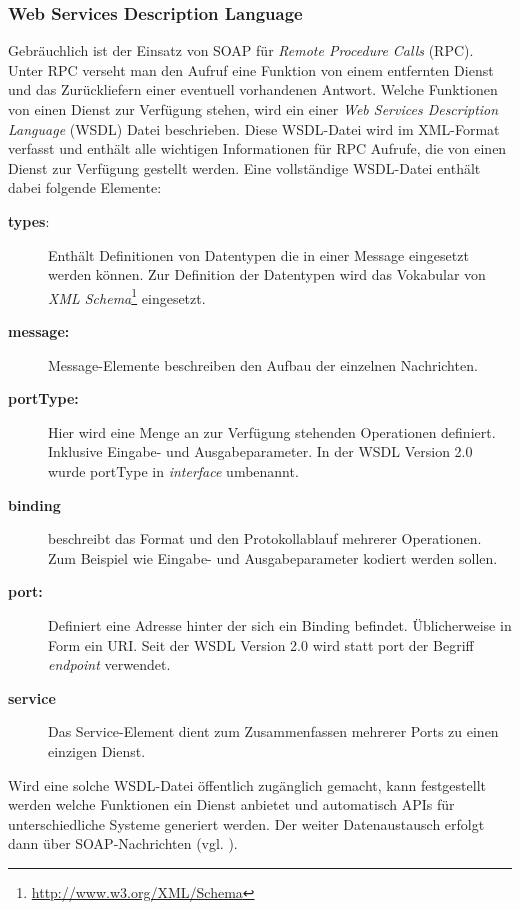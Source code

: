 \subsubsection{Web Services Description Language} %
\label{ssub:wsdl}


Gebräuchlich ist der Einsatz von SOAP für \emph{Remote Procedure Calls} (RPC). Unter RPC verseht man den Aufruf eine Funktion von einem entfernten Dienst und das Zurückliefern einer eventuell vorhandenen Antwort. Welche Funktionen von einen Dienst zur Verfügung stehen, wird ein einer \emph{Web Services Description Language} (WSDL) Datei beschrieben. Diese WSDL-Datei wird im XML-Format verfasst und enthält alle wichtigen Informationen für RPC Aufrufe, die von einen Dienst zur Verfügung gestellt werden. Eine vollständige WSDL-Datei enthält dabei folgende Elemente:

\begin{description}
    \item[\textbf{types}:] Enthält Definitionen von Datentypen die in einer Message eingesetzt werden können. Zur Definition der Datentypen wird das Vokabular von \emph{XML Schema}\footnote{\url{http://www.w3.org/XML/Schema}} eingesetzt.
    \item[\textbf{message:}] Message-Elemente beschreiben den Aufbau der einzelnen Nachrichten.
    \item[\textbf{portType:}] Hier wird eine Menge an zur Verfügung stehenden Operationen definiert. Inklusive Eingabe- und Ausgabeparameter. In der WSDL Version 2.0 wurde portType in \emph{interface} umbenannt.
    \item[\textbf{binding}] beschreibt das Format und den Protokollablauf mehrerer Operationen. Zum Beispiel wie Eingabe- und Ausgabeparameter kodiert werden sollen. 
    \item[\textbf{port:}] Definiert eine Adresse hinter der sich ein Binding befindet. Üblicherweise in Form ein URI. Seit der WSDL Version 2.0 wird statt port der Begriff \emph{endpoint} verwendet.
    \item[\textbf{service}] Das Service-Element dient zum Zusammenfassen mehrerer Ports zu einen einzigen Dienst.
\end{description}

Wird eine solche WSDL-Datei öffentlich zugänglich gemacht, kann festgestellt werden welche Funktionen ein Dienst anbietet und automatisch APIs für unterschiedliche Systeme generiert werden. Der weiter Datenaustausch erfolgt dann über SOAP-Nachrichten (vgl. \cite{wsdl2001}).

